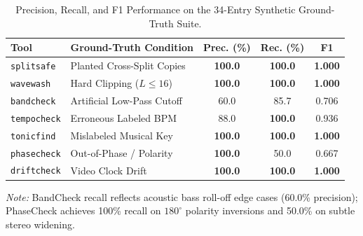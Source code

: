 \documentclass[10pt,journal,compsoc]{IEEEtran}
\begin{document}
\begin{table}[t]
\centering
\caption{Precision, Recall, and F1 Performance on the 34-Entry Synthetic Ground-Truth Suite.}
\label{tab:34_benchmark}
\small
\setlength{\tabcolsep}{3.5pt}
\begin{tabular}{@{}llccc@{}}
\toprule
\textbf{Tool} & \textbf{Ground-Truth Condition} & \textbf{Prec. (\%)} & \textbf{Rec. (\%)} & \textbf{F1} \\
\midrule
\texttt{splitsafe} & Planted Cross-Split Copies & \textbf{100.0} & \textbf{100.0} & \textbf{1.000} \\
\texttt{wavewash} & Hard Clipping ($L \le 16$) & \textbf{100.0} & \textbf{100.0} & \textbf{1.000} \\
\texttt{bandcheck} & Artificial Low-Pass Cutoff & 60.0 & 85.7 & 0.706 \\
\texttt{tempocheck} & Erroneous Labeled BPM & 88.0 & \textbf{100.0} & 0.936 \\
\texttt{tonicfind} & Mislabeled Musical Key & \textbf{100.0} & \textbf{100.0} & \textbf{1.000} \\
\texttt{phasecheck} & Out-of-Phase / Polarity & \textbf{100.0} & 50.0 & 0.667 \\
\texttt{driftcheck} & Video Clock Drift & \textbf{100.0} & \textbf{100.0} & \textbf{1.000} \\
\bottomrule
\end{tabular}
\vspace{1mm}
\begin{minipage}{\columnwidth}
\scriptsize \textit{Note:} BandCheck recall reflects acoustic bass roll-off edge cases (60.0\% precision); PhaseCheck achieves 100\% recall on $180^\circ$ polarity inversions and 50.0\% on subtle stereo widening.
\end{minipage}
\end{table}
\end{document}
